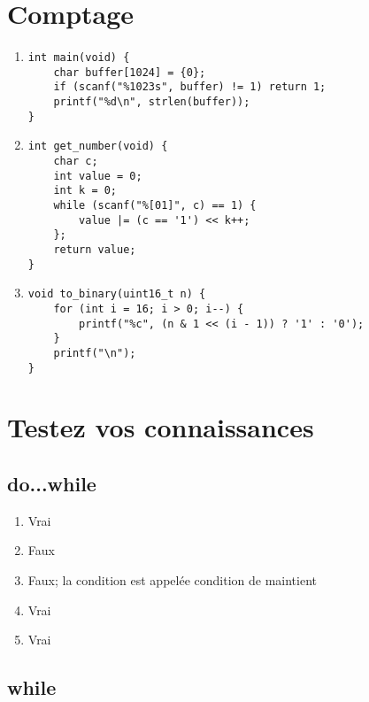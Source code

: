 \begin{multicols}{2}
\section{Comptage}

\begin{enumerate}[label=(\roman*)]
\item \begin{lstlisting}
int main(void) {
    char buffer[1024] = {0};
    if (scanf("%1023s", buffer) != 1) return 1;
    printf("%d\n", strlen(buffer));
}
\end{lstlisting}

\item \begin{lstlisting}
int get_number(void) {
    char c;
    int value = 0;
    int k = 0;
    while (scanf("%[01]", c) == 1) {
        value |= (c == '1') << k++;
    };
    return value;
}
\end{lstlisting}

\item \begin{lstlisting}
void to_binary(uint16_t n) {
    for (int i = 16; i > 0; i--) {
        printf("%c", (n & 1 << (i - 1)) ? '1' : '0');
    }
    printf("\n");
}
\end{lstlisting}

\end{enumerate}

\section{Testez vos connaissances}

\subsection{do...while}

\begin{enumerate}[label=(\roman*)]
    \item Vrai
    \item Faux
    \item Faux; la condition est appelée condition de maintient
    \item Vrai
    \item Vrai
\end{enumerate}

\subsection{while}


\end{multicols}
